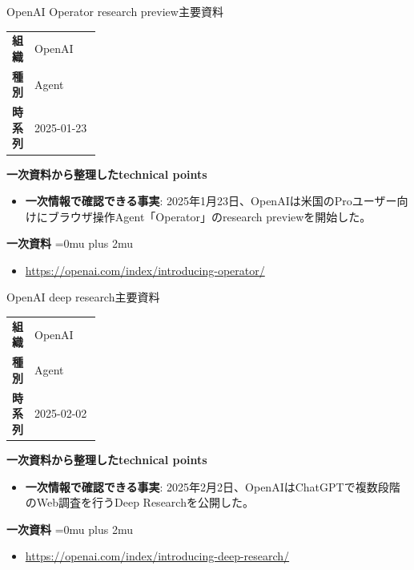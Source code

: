 \begin{technicalnote}{OpenAI Operator research preview}{主要資料}
\begingroup
\begin{tabularx}{\linewidth}{@{}>{\bfseries}p{0.22\linewidth}X@{}}
組織 & OpenAI \\
種別 & Agent \\
時系列 & 2025-01-23 \\
\end{tabularx}
\smallskip
{\bfseries 一次資料から整理したtechnical points}
\begin{itemize}[leftmargin=1.5em,itemsep=0.35em]
\item \textbf{一次情報で確認できる事実}: 2025年1月23日、OpenAIは米国のProユーザー向けにブラウザ操作Agent「Operator」のresearch previewを開始した。
\end{itemize}
\begin{samepage}
{\bfseries 一次資料}
\begingroup\sloppy
\Urlmuskip=0mu plus 2mu\relax
\begin{itemize}[leftmargin=1.5em,itemsep=0.25em]
\item {\scriptsize\url{https://openai.com/index/introducing-operator/}}
\end{itemize}
\endgroup
\end{samepage}
\endgroup
\end{technicalnote}
\medskip

\begin{technicalnote}{OpenAI deep research}{主要資料}
\begingroup
\begin{tabularx}{\linewidth}{@{}>{\bfseries}p{0.22\linewidth}X@{}}
組織 & OpenAI \\
種別 & Agent \\
時系列 & 2025-02-02 \\
\end{tabularx}
\smallskip
{\bfseries 一次資料から整理したtechnical points}
\begin{itemize}[leftmargin=1.5em,itemsep=0.35em]
\item \textbf{一次情報で確認できる事実}: 2025年2月2日、OpenAIはChatGPTで複数段階のWeb調査を行うDeep Researchを公開した。
\end{itemize}
\begin{samepage}
{\bfseries 一次資料}
\begingroup\sloppy
\Urlmuskip=0mu plus 2mu\relax
\begin{itemize}[leftmargin=1.5em,itemsep=0.25em]
\item {\scriptsize\url{https://openai.com/index/introducing-deep-research/}}
\end{itemize}
\endgroup
\end{samepage}
\endgroup
\end{technicalnote}
\medskip

